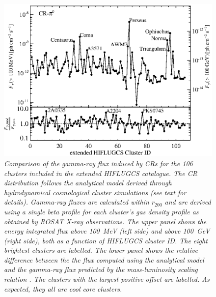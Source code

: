 \documentclass[10pt,aps,pra,reprint,amsmath,amsfonts,amssymb,showpacs,nofootinbib,floatfix]{revtex4-1}
\newcommand{\rvir}{r_{200}}
\begin{document}
\begin{figure}%
\begin{minipage}{2.0\columnwidth}
 \includegraphics[width=0.99\columnwidth]{figures/Flux.comp.CR.eps}
 \caption{\it Comparison of the gamma-ray flux induced by CRs for the
   106 clusters included in the extended HIFLUGCS catalogue.  The CR
   distribution follows the analytical model derived through
   hydrodynamical cosmological cluster simulations \protect
   \cite{2010MNRAS.409..449P} (see text for details).  Gamma-ray
   fluxes are calculated within $\rvir$ and are derived using a single
   beta profile for each cluster's gas density profile as obtained by
   ROSAT X-ray observations. The upper panel shows the energy
   integrated flux above 100~MeV (left side) and above 100~GeV (right
   side), both as a function of HIFLUGCS cluster ID. The eight
   brightest clusters are labelled. The lower panel shows the relative
   difference between the the flux computed using the analytical model
   and the gamma-ray flux predicted by the mass-luminosity scaling
   relation \cite{2010MNRAS.409..449P}. The clusters with the largest
   positive offset are labelled. As expected, they all are cool core
   clusters.}
 \label{fig19}
\end{minipage}
\end{figure}
\end{document}
